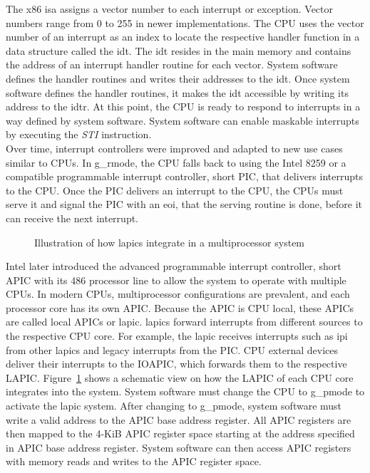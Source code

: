 The x86 \gls{isa} assigns a vector number to each interrupt or exception. Vector
numbers range from 0 to 255 in newer implementations. The CPU uses the vector
number of an interrupt as an index to locate the respective handler function in
a data structure called the \gls{idt}. The \gls{idt} resides in the main memory
and contains the address of an interrupt handler routine for each vector. System
software defines the handler routines and writes their addresses to the
\gls{idt}. Once system software defines the handler routines, it makes the
\gls{idt} accessible by writing its address to the \gls{idtr}. At this point,
the CPU is ready to respond to interrupts in a way defined by system software.
System software can enable maskable interrupts by executing the \textit{STI}
instruction.\\

Over time, interrupt controllers were improved and adapted to new use cases
similar to CPUs. In \gls{g_rmode}, the CPU falls back to using the Intel 8259 or
a compatible programmable interrupt controller, short PIC, that delivers
interrupts to the CPU. Once the PIC delivers an interrupt to the CPU, the CPUs
must serve it and signal the PIC with an \gls{eoi}, that the serving routine is
done, before it can receive the next interrupt. \\

\begin{figure}
    \begin{center}
        
        \caption{Illustration of how \glspl{lapic} integrate in a
            multiprocessor system}
        \label{fig:state:technical:lapic}
    \end{center}
\end{figure}

Intel later introduced the advanced programmable interrupt controller, short
APIC with its 486 processor line to allow the system to operate with multiple
CPUs. In modern CPUs, multiprocessor configurations are prevalent, and each
processor core has its own APIC. Because the APIC is CPU local, these APICs are
called local APICs or \gls{lapic}. \glspl{lapic} forward interrupts from
different sources to the respective CPU core. For example, the \gls{lapic}
receives interrupts such as \gls{ipi} from other \glspl{lapic} and legacy
interrupts from the PIC. CPU external devices deliver their interrupts to the
IOAPIC, which forwards them to the respective LAPIC.
Figure~\ref{fig:state:technical:lapic} shows a schematic view on how the LAPIC
of each CPU core integrates into the system. System software must change the CPU
to \gls{g_pmode} to activate the \gls{lapic} system. After changing to
\gls{g_pmode}, system software must write a valid address to the APIC base
address register. All APIC registers are then mapped to the 4-KiB APIC register
space starting at the address specified in APIC base address register. System
software can then access APIC registers with memory reads and writes to the APIC
register space.

